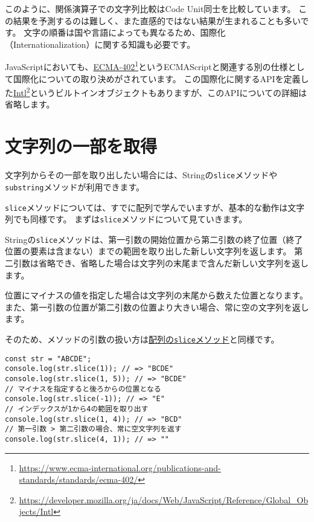 このように、関係演算子での文字列比較はCode Unit同士を比較しています。
この結果を予測するのは難しく、また直感的ではない結果が生まれることも多いです。
文字の順番は国や言語によっても異なるため、国際化（Internationalization）に関する知識も必要です。

JavaScriptにおいても、\href{https://www.ecma-international.org/publications-and-standards/standards/ecma-402/}{ECMA-402}\footnote{\url{https://www.ecma-international.org/publications-and-standards/standards/ecma-402/}}というECMAScriptと関連する別の仕様として国際化についての取り決めがされています。
この国際化に関するAPIを定義した\href{https://developer.mozilla.org/ja/docs/Web/JavaScript/Reference/Global_Objects/Intl}{Intl}\footnote{\url{https://developer.mozilla.org/ja/docs/Web/JavaScript/Reference/Global_Objects/Intl}}というビルトインオブジェクトもありますが、このAPIについての詳細は省略します。

\hypertarget{slice}{%
\section{文字列の一部を取得}\label{slice}}

文字列からその一部を取り出したい場合には、Stringの\texttt{slice}メソッドや\texttt{substring}メソッドが利用できます。

\texttt{slice}メソッドについては、すでに配列で学んでいますが、基本的な動作は文字列でも同様です。
まずは\texttt{slice}メソッドについて見ていきます。

Stringの\texttt{slice}メソッドは、第一引数の開始位置から第二引数の終了位置（終了位置の要素は含まない）までの範囲を取り出した新しい文字列を返します。
第二引数は省略でき、省略した場合は文字列の末尾まで含んだ新しい文字列を返します。

位置にマイナスの値を指定した場合は文字列の末尾から数えた位置となります。
また、第一引数の位置が第二引数の位置より大きい場合、常に空の文字列を返します。

そのため、メソッドの引数の扱い方は\hyperlink{slice}{配列の\texttt{slice}メソッド}と同様です。

\begin{lstlisting}
const str = "ABCDE";
console.log(str.slice(1)); // => "BCDE"
console.log(str.slice(1, 5)); // => "BCDE"
// マイナスを指定すると後ろからの位置となる
console.log(str.slice(-1)); // => "E"
// インデックスが1から4の範囲を取り出す
console.log(str.slice(1, 4)); // => "BCD"
// 第一引数 > 第二引数の場合、常に空文字列を返す
console.log(str.slice(4, 1)); // => ""
\end{lstlisting}


